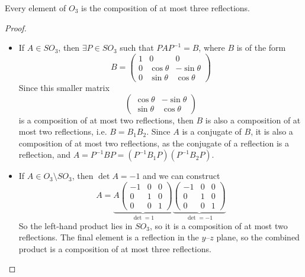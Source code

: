 \documentclass{article}
\begin{document}
\begin{corollary}
    Every element of $O_3$ is the composition of at most three reflections.
\end{corollary}
\begin{proof}
    \begin{itemize}
        \item If $A \in SO_3$, then $\exists P \in SO_3$ such that $PAP^{-1} = B$, where $B$ is of the form
              \[ B = \begin{pmatrix}
                      1 & 0           & 0            \\
                      0 & \cos \theta & -\sin \theta \\
                      0 & \sin \theta & \cos \theta
                  \end{pmatrix} \]
              Since this smaller matrix
              \[ \begin{pmatrix}
                      \cos \theta & -\sin \theta \\
                      \sin \theta & \cos \theta
                  \end{pmatrix} \]
              is a composition of at most two reflections, then $B$ is also a composition of at most two reflections, i.e. $B = B_1 B_2$. Since $A$ is a conjugate of $B$, it is also a composition of at most two reflections, as the conjugate of a reflection is a reflection, and $A = P^{-1}BP = (P^{-1}B_1P)(P^{-1}B_2P)$.
        \item If $A \in O_3 \setminus SO_3$, then $\det A = -1$ and we can construct
              \[ A = \underbrace{A\begin{pmatrix}
                          -1 & 0 & 0 \\
                          0  & 1 & 0 \\
                          0  & 0 & 1
                      \end{pmatrix}}_{\det = 1}\underbrace{\begin{pmatrix}
                          -1 & 0 & 0 \\
                          0  & 1 & 0 \\
                          0  & 0 & 1
                      \end{pmatrix}}_{\det = -1} \]
              So the left-hand product lies in $SO_3$, so it is a composition of at most two reflections. The final element is a reflection in the $y$--$z$ plane, so the combined product is a composition of at most three reflections.
    \end{itemize}
\end{proof}
\end{document}
